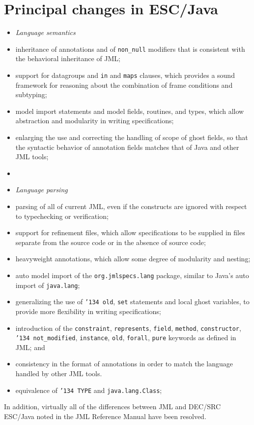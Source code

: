 \documentclass{llncs}
\begin{document}
\section{Principal changes in ESC/Java}
\setlength{\partopsep}{0in}\setlength{\parskip}{0in}\setlength{\itemsep}{0in}\setlength{\topsep}{0in}
\begin{itemize}
\setlength{\partopsep}{0in}\setlength{\parskip}{0in}\setlength{\itemsep}{0in}\setlength{\topsep}{0in}
\item[] \textit{Language semantics}
\item inheritance of annotations and of \texttt{non\_null}
  modifiers that is consistent with the behavioral inheritance of JML;
\item support for datagroups and \texttt{in} and \texttt{maps} clauses, which provides a sound framework for reasoning about the combination of frame conditions and subtyping;
\item model import statements and model fields, routines, and types, which allow abstraction 
and modularity in writing specifications;
\item enlarging the use and correcting the handling of scope of ghost fields, so that the syntactic behavior 
of annotation fields matches that of Java and other JML tools;
\item[]
\item[] \textit{Language parsing}
\item parsing of all of current JML, even if the constructs are
  ignored with respect to typechecking or verification;
\item support for refinement files, which allow specifications to be supplied in files separate from the source code or in the absence of source code;
\item heavyweight annotations, which allow some degree of modularity and nesting;
\item auto model import of the \texttt{org.jmlspecs.lang} package, similar to Java's auto import of \texttt{java.lang};
\item generalizing the use of \texttt{\char'134 old}, \texttt{set} statements and local ghost variables, to provide more flexibility in writing specifications;
\item introduction of the \texttt{constraint}, \texttt{represents}, \texttt{field}, \texttt{method},
\texttt{constructor}, 
\texttt{\char'134 not\_modified}, \texttt{instance}, \texttt{old}, \texttt{forall},
\texttt{pure} keywords as defined in JML; and
\item consistency in the format of annotations in order to match the language handled by other JML tools.
\item equivalence of \texttt{\char'134 TYPE} and \texttt{java.lang.Class};
\end{itemize}
In addition, virtually all of the differences between JML and DEC/SRC ESC/Java
noted in the JML Reference Manual have been resolved.
\end{document}
